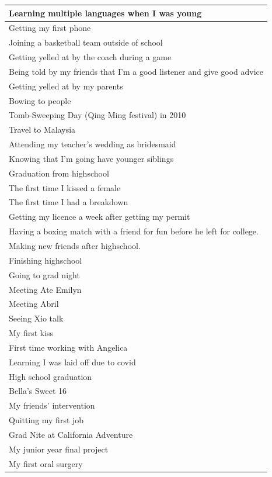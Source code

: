 \documentclass[
  .7em,
  letterpaper,
  DIV=11,
  numbers=noendperiod]{scrartcl}
\begin{document}
\begin{table}
\begin{tabular}{l}
\hline
Learning multiple languages when I was young\\
\hline
Getting my first phone\\
\hline
Joining a basketball team outside of school\\
\hline
Getting yelled at by the coach during a game\\
\hline
Being told by my friends that I'm a good listener and give good advice\\
\hline
Getting yelled at by my parents\\
\hline
Bowing to people\\
\hline
Tomb-Sweeping Day (Qing Ming festival) in 2010\\
\hline
Travel to Malaysia\\
\hline
Attending my teacher's wedding as bridesmaid\\
\hline
Knowing that I'm going have younger siblings\\
\hline
Graduation from highschool\\
\hline
The first time I kissed a female\\
\hline
The first time I had a breakdown\\
\hline
Getting my licence a week after getting my permit\\
\hline
Having a boxing match with a friend for fun before he left for college.\\
\hline
Making new friends after highschool.\\
\hline
Finishing highschool\\
\hline
Going to grad night\\
\hline
Meeting Ate Emilyn\\
\hline
Meeting Abril\\
\hline
Seeing Xio talk\\
\hline
My first kiss\\
\hline
First time working with Angelica\\
\hline
Learning I was laid off due to covid\\
\hline
High school graduation\\
\hline
Bella's Sweet 16\\
\hline
My friends' intervention\\
\hline
Quitting my first job\\
\hline
Grad Nite at California Adventure\\
\hline
My junior year final project\\
\hline
My first oral surgery\\
\hline

\end{tabular}
\end{table}
\end{document}
